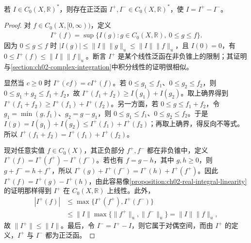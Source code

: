 \documentclass[../../main.tex]{subfiles}
\begin{document}
\begin{lemma}\label{lemma:ch07-functional-jordan}
若 $I\in C_0(X,\mathbb R)^*$，则存在正泛函 $I^+,I^-\in C_0(X,\mathbb R)^*$，使 $I=I^+-I^-$。
\end{lemma}
\begin{proof}
对 $f\in C_0(X,[0,\infty))$，定义
\begin{align*}
I^+(f)=\sup\{I(g):g\in C_0(X,\mathbb R),\ 0\leqslant g\leqslant f\}.
\end{align*}
因为 $0\leqslant g\leqslant f$ 时 $|I(g)|\leqslant\|I\|\|g\|_u\leqslant\|I\|\|f\|_u$，且 $I(0)=0$，有 $0\leqslant I^+(f)\leqslant\|I\|\|f\|_u$。断言 $I^+$ 是某个线性泛函在非负锥上的限制；其证明与\cref{section:ch02-complex-integration}中积分线性的证明很相似。

显然当 $c\geqslant0$ 时 $I^+(cf)=cI^+(f)$。若 $0\leqslant g_1\leqslant f_1$、$0\leqslant g_2\leqslant f_2$，则 $0\leqslant g_1+g_2\leqslant f_1+f_2$，故 $I^+(f_1+f_2)\geqslant I(g_1)+I(g_2)$。取上确界得到 $I^+(f_1+f_2)\geqslant I^+(f_1)+I^+(f_2)$。另一方面，若 $0\leqslant g\leqslant f_1+f_2$，令 $g_1=\min(g,f_1)$、$g_2=g-g_1$，则 $0\leqslant g_1\leqslant f_1$、$0\leqslant g_2\leqslant f_2$。于是 $I(g)=I(g_1)+I(g_2)\leqslant I^+(f_1)+I^+(f_2)$；再取上确界，得反向不等式。所以 $I^+(f_1+f_2)=I^+(f_1)+I^+(f_2)$。

现对任意实值 $f\in C_0(X)$，其正负部分 $f^+,f^-$ 都在非负锥中，定义 $I^+(f)=I^+(f^+)-I^+(f^-)$。若也有 $f=g-h$，其中 $g,h\geqslant0$，则 $g+f^-=h+f^+$，所以 $I^+(g)+I^+(f^-)=I^+(h)+I^+(f^+)$。因此 $I^+(f)=I^+(g)-I^+(h)$，由此容易像\cref{proposition:ch02-real-integral-linearity}的证明那样得到 $I^+$ 在 $C_0(X,\mathbb R)$ 上线性。此外，
\begin{align*}
|I^+(f)|&\leqslant\max\{I^+(f^+),I^+(f^-)\}\\
&\leqslant\|I\|\max\{\|f^+\|_u,\|f^-\|_u\}=\|I\|\|f\|_u,
\end{align*}
故 $\|I^+\|\leqslant\|I\|$。最后，令 $I^-=I^+-I$，则它属于对偶空间，而由 $I^+$ 的定义，$I^+$ 与 $I^-$ 都为正泛函。
\end{proof}
\end{document}
